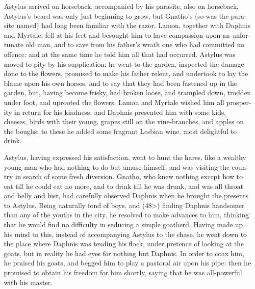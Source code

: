 \documentclass{book}
\begin{document}
\begin{pairs}
\begin{Rightside}
\begin{english}
  Astylus arrived on horseback, accompanied by his parasite, also on horseback.  Astylus's beard was only just beginning to grow, but Gnatho's (so was the parasite named) had long been familiar with the razor.  Lamon, together with Daphnis and Myrtale, fell at his feet and besought him to have compassion upon an unfortunate old man, and to save from his father's wrath one who had committed no offence: and at the same time he told him all that had occurred.  Astylus was moved to pity by his supplication: he went to the garden, inspected the damage done to the flowers, promised to make his father relent, and undertook to lay the blame upon his own horses, and to say that they had been fastened up in the garden, but, having become frisky, had broken loose, and trampled down, trodden under foot, and uprooted the flowers.  Lamon and Myrtale wished him all prosperity in return for his kindness: and Daphnis presented him with some kids, cheeses, birds with their young, grapes still on the vine-branches, and apples on the boughs: to these he added some fragrant Lesbian wine, most delightful to drink.
\pend


  Astylus, having expressed his satisfaction, went to hunt the hares, like a wealthy young man who had nothing to do but amuse himself, and was visiting the country in search of some fresh diversion.  Gnatho, who knew nothing except how to eat till he could eat no more, and to drink till he was drunk, and was all throat and belly and lust, had carefully observed Daphnis when he brought the presents to Astylus.  Being naturally fond of boys, and (48>) finding Daphnis handsomer than any of the youths in the city, he resolved to make advances to him, thinking that he would find no difficulty in seducing a simple goatherd.  Having made up his mind to this, instead of accompanying Astylus to the chase, he went down to the place where Daphnis was tending his flock, under pretence of looking at the goats, but in reality he had eyes for nothing but Daphnis.  In order to coax him, he praised his goats, and begged him to play a pastoral air upon his pipe: then he promised to obtain his freedom for him shortly, saying that he was all-powerful with his master.
\pend



\end{english}
\end{Rightside}
\end{pairs}
\end{document}
